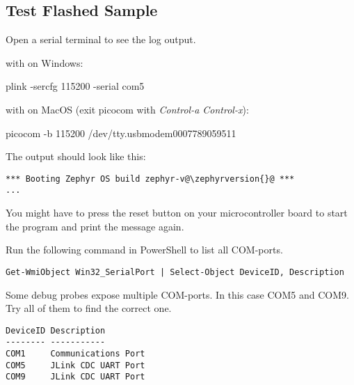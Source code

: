\subsection{Test Flashed Sample}

Open a serial terminal to see the log output.

with  on Windows:

\begin{monobox}
plink -sercfg 115200 -serial com5
\end{monobox}

with  on MacOS (exit picocom with \emph{Control-a Control-x}):

\begin{monobox}
picocom -b 115200 /dev/tty.usbmodem0007789059511
\end{monobox}

The output should look like this:

\begin{lstlisting}
*** Booting Zephyr OS build zephyr-v@\zephyrversion{}@ ***
...
\end{lstlisting}

You might have to press the reset button on your microcontroller board to start the program and print the message again.

\begin{infobox}
  Run the following command in PowerShell to list all COM-ports.
\begin{lstlisting}
Get-WmiObject Win32_SerialPort | Select-Object DeviceID, Description
\end{lstlisting}

  Some debug probes expose multiple COM-ports.
  In this case COM5 and COM9.
  Try all of them to find the correct one.

\begin{lstlisting}
DeviceID Description
-------- -----------
COM1     Communications Port
COM5     JLink CDC UART Port
COM9     JLink CDC UART Port
\end{lstlisting}
\end{infobox}
